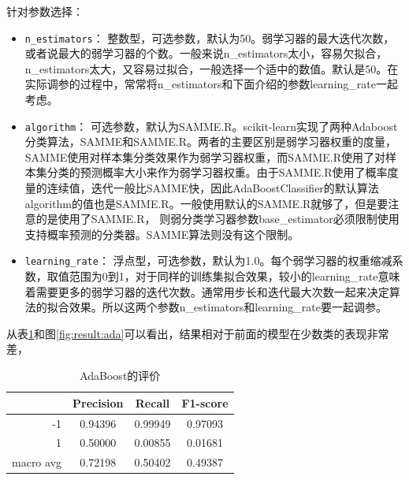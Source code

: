 \documentclass[a4paper]{article}
\begin{document}
针对参数选择：
\begin{itemize}
    

    \item \texttt{n\_estimators}： 整数型，可选参数，默认为50。弱学习器的最大迭代次数，或者说最大的弱学习器的个数。一般来说n\_estimators太小，容易欠拟合，n\_estimators太大，又容易过拟合，一般选择一个适中的数值。默认是50。在实际调参的过程中，常常将n\_estimators和下面介绍的参数learning\_rate一起考虑。
    
    \item \texttt{algorithm}： 可选参数，默认为SAMME.R。scikit-learn实现了两种Adaboost分类算法，SAMME和SAMME.R。两者的主要区别是弱学习器权重的度量，SAMME使用对样本集分类效果作为弱学习器权重，而SAMME.R使用了对样本集分类的预测概率大小来作为弱学习器权重。由于SAMME.R使用了概率度量的连续值，迭代一般比SAMME快，因此AdaBoostClassifier的默认算法algorithm的值也是SAMME.R。一般使用默认的SAMME.R就够了，但是要注意的是使用了SAMME.R， 则弱分类学习器参数base\_estimator必须限制使用支持概率预测的分类器。SAMME算法则没有这个限制。
    
    \item \texttt{learning\_rate}： 浮点型，可选参数，默认为1.0。每个弱学习器的权重缩减系数，取值范围为0到1，对于同样的训练集拟合效果，较小的learning\_rate意味着需要更多的弱学习器的迭代次数。通常用步长和迭代最大次数一起来决定算法的拟合效果。所以这两个参数n\_estimators和learning\_rate要一起调参。
    
\end{itemize}

从表\ref{tb:ada}和图\ref{fig:result:ada}可以看出，结果相对于前面的模型在少数类的表现非常差，

\begin{table}[!h]
    \centering
    \renewcommand{\arraystretch}{1.5}
    \begin{tabular}{|r|c|c|c|}
        \hline
                  & Precision & Recall & F1-score \\ \hline
        -1        &     0.94396     &     0.99949   &    0.97093      \\ \hline
        1         &     0.50000      &     0.00855   &   0.01681       \\ \hline
        macro avg &      0.72198     &     0.50402   &    0.49387      \\ \hline
    \end{tabular}
    \caption{AdaBoost的评价}
    \label{tb:ada}
\end{table}
\end{document}
